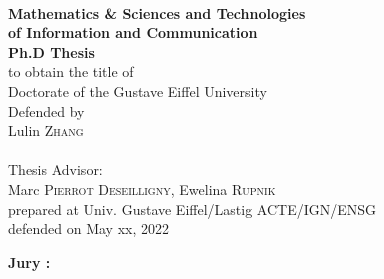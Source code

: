 \begin{titlepage}
\begin{center}
	
\vspace*{0.3cm}
 \\
\noindent \textbf{Mathematics \& Sciences and Technologies\\of Information and Communication} \\
\vspace*{0.5cm}
\noindent \Huge \textbf{Ph.D Thesis} \\
\vspace*{0.3cm}
\noindent \large {to obtain the title of} \\
\vspace*{0.3cm}
\noindent \Large Doctorate of the Gustave Eiffel University \\
\vspace*{0.4cm}
\noindent \large {Defended by\\}
\noindent \huge Lulin \textsc{Zhang} \\
\vspace*{0.8cm}
 \\
\vspace*{0.8cm}
\noindent \Large Thesis Advisor: \\
Marc \textsc{Pierrot Deseilligny}, Ewelina \textsc{Rupnik}\\
\vspace*{0.2cm}
\noindent \Large prepared at Univ. Gustave Eiffel/Lastig ACTE/IGN/ENSG\\
\vspace*{0.2cm}
\noindent \large defended on May xx, 2022 \\
\vspace*{0.5cm}
\end{center}
\noindent \large \textbf{Jury :} \\
\begin{center}

\end{center}
\end{titlepage}

